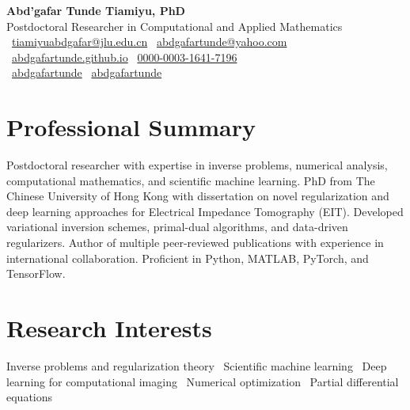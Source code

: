 \documentclass[11pt,a4paper]{article}
\begin{document}
\begin{center}
    {\LARGE\bfseries Abd'gafar Tunde Tiamiyu, PhD}\\[6pt]
    {\large Postdoctoral Researcher in Computational and Applied Mathematics}\\[8pt]
    \faEnvelope\ \href{mailto:tiamiyuabdgafar@jlu.edu.cn}{tiamiyuabdgafar@jlu.edu.cn} \quad
    \faEnvelope\ \href{mailto:abdgafartunde@yahoo.com}{abdgafartunde@yahoo.com}\\[2pt]
    \faGlobe\ \href{https://abdgafartunde.github.io}{abdgafartunde.github.io} \quad
    \faOrcid\ \href{https://orcid.org/0000-0003-1641-7196}{0000-0003-1641-7196}\\[2pt]
    \faLinkedin\ \href{https://linkedin.com/in/abdgafartunde}{abdgafartunde} \quad
    \faGithub\ \href{https://github.com/abdgafartunde}{abdgafartunde}
\end{center}

\section{Professional Summary}

Postdoctoral researcher with expertise in inverse problems, numerical analysis, computational mathematics, and scientific machine learning. PhD from The Chinese University of Hong Kong with dissertation on novel regularization and deep learning approaches for Electrical Impedance Tomography (EIT). Developed variational inversion schemes, primal-dual algorithms, and data-driven regularizers. Author of multiple peer-reviewed publications with experience in international collaboration. Proficient in Python, MATLAB, PyTorch, and TensorFlow.

\section{Research Interests}

Inverse problems and regularization theory \textbullet\ 
Scientific machine learning \textbullet\ 
Deep learning for computational imaging \textbullet\ 
Numerical optimization \textbullet\ 
Partial differential equations
\end{document}
